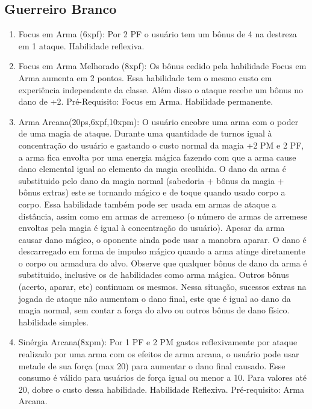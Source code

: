  \subsection{Guerreiro Branco}
  
 
\begin{enumerate}

	\item Focus em Arma (6xpf): Por 2 PF o usuário tem um bônus de 4 na destreza em 1 ataque. Habilidade reflexiva.

	\item Focus em Arma Melhorado (8xpf): Os bônus cedido pela habilidade Focus em Arma aumenta em 2 pontos. Essa habilidade tem o mesmo custo em experiência independente da classe. Além disso o ataque recebe um bônus no dano de +2. Pré-Requisito: Focus em Arma. Habilidade permanente.

     
  \item Arma Arcana(20ps,6xpf,10xpm): O usuário encobre uma arma com o poder de uma magia de ataque. Durante uma quantidade de turnos igual à concentração do usuário e gastando o custo normal da magia +2 PM e 2 PF, a arma fica envolta por uma energia mágica fazendo com que a arma cause dano elemental igual ao elemento da magia escolhida. O dano da arma é substituido pelo dano da magia normal (sabedoria + bônus da magia + bônus extras) este se tornando mágico e de toque quando usado corpo a corpo. Essa habilidade também pode ser usada em armas de ataque a distância, assim como em armas de arremeso (o número de armas de arremese envoltas pela magia é igual à concentração do usuário). Apesar da arma causar dano mágico, o oponente ainda pode usar a manobra aparar. O dano é descarregado em forma de impulso mágico quando a arma atinge diretamente o corpo ou armadura do alvo. Observe que qualquer bônus de dano da arma é substituido, inclusive os de habilidades como arma mágica. Outros bônus (acerto, aparar, etc) continuam os mesmos. Nessa situação, sucessos extras na jogada de ataque não aumentam o dano final, este que é igual ao dano da magia normal, sem contar a força do alvo ou outros bônus de dano físico. habilidade simples. 
  
  \item Sinérgia Arcana(8xpm): Por 1 PF e 2 PM gastos reflexivamente por ataque realizado por uma arma com os efeitos de arma arcana, o usuário pode usar metade de sua força (max 20) para aumentar o dano final causado. Esse consumo é válido para usuários de força igual ou menor a 10. Para valores até 20, dobre o custo dessa habilidade. Habilidade Reflexiva. Pré-requisito: Arma Arcana. 
  

\end{enumerate}
